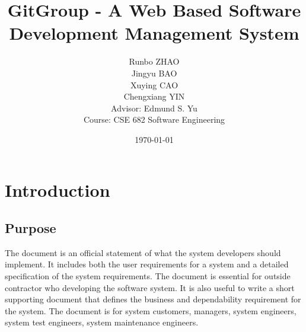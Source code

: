 \documentclass[12pt,a4paper]{report}
\title{GitGroup - A Web Based Software Development Management System}
\date{\today}
\author{Runbo ZHAO \\ Jingyu BAO \\ Xuying CAO \\ Chengxiang YIN
\\[1cm]{\small Advisor: Edmund S. Yu} \\ {\small Course: CSE 682 Software Engineering}}
\begin{document}

\maketitle
\tableofcontents
\newpage

\cleardoublepage
{}
\pagestyle{fancy}


\chapter{Introduction}
\section{Purpose}
The document is an official statement of what the system developers should implement. It includes both the user requirements for a system and a detailed specification of the system requirements. The document is essential for outside contractor who developing the software system. It is also useful to write a short supporting document that defines the business and dependability requirement for the system. The document is for system customers, managers, system engineers, system test engineers, system maintenance engineers.
\end{document}
